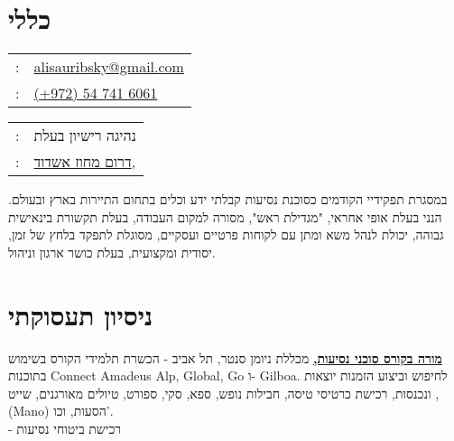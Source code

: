 \setRTL
\hspace{.25\textwidth}
\begin{minipage}[t]{.5\textwidth}
	\par{\par}
\end{minipage}
\section{כללי}
\label{sec:basicinfoheb}
\unsetRTL
\setLTR
\begin{minipage}[t]{.5\linewidth}
	\begin{tabular}{rp{.75\linewidth}}
		\baselineskip=20pt
		\email{} : &\href{mailto:alisauribsky@gmail.com}{alisauribsky@gmail.com}\\
		\phone{} : &\href{tel:972547416061}{(+972) 54 741 6061}
	\end{tabular}
\end{minipage}
\begin{minipage}[t]{.5\linewidth}
	\begin{tabular}{rl}
		\licence{} :  &נהיגה רישיון בעלת\\
		\location{} : &\href{https://goo.gl/maps/SaMTRU5cPT5GynTL8}{דרום מחוז אשדוד,}
	\end{tabular}
\end{minipage}	
\unsetLTR
\unsetRTL
\setRTL
\begin{minipage}[t]{1\linewidth}
	\vspace{0.25cm} %
במסגרת תפקידיי הקודמים כסוכנת נסיעות קבלתי ידע וכלים בתחום התיירות בארץ ובעולם. הנני בעלת אופי אחראי, "מגדילת ראש", מסורה למקום העבודה, בעלת תקשורת בינאישית גבוהה, יכולת לנהל משא ומתן עם לקוחות פרטיים ועסקיים, מסוגלת לתפקד בלחץ של זמן, יסודית ומקצועית, בעלת כושר ארגון וניהול. 
\end{minipage}

\section{ניסיון תעסוקתי}

{\href{https://bit.ly/385JmIG}{
	\textbf{מורה 
{בקורס סוכני נסיעות,}}}
מכללת ניומן סנטר, תל אביב}
{- הכשרת תלמידי הקורס בשימוש בתוכנות
Connect Amadeus Alp, Global, Go ו- Gilboa.
לחיפוש וביצוע הזמנות יוצאות ונכנסות, רכישת כרטיסי טיסה, חבילות נופש, ספא, סקי, ספורט, טיולים מאורגנים, שייט ,(Mano) הסעות, וכו'. \\
- רכישת ביטוחי נסיעות
}
{}

